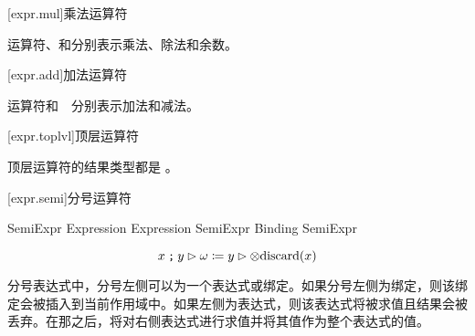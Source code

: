 [expr.mul]{乘法运算符}

\pnum
运算符\tcode{*}、\tcode{/}和\tcode{\%}分别表示乘法、除法和余数。

[expr.add]{加法运算符}

\pnum
运算符\tcode{+}和\ \tcode{-}\ 分别表示加法和减法。

[expr.toplvl]{顶层运算符}

\pnum
顶层运算符的结果类型都是 。

[expr.semi]{分号运算符}

\begin{bnf}{SemiExpr}
    Expression \br
    Expression \terminal{;} SemiExpr\br
    Binding \terminal{;} SemiExpr\br
\end{bnf}

$$ x \mathbin{\texttt{;}} y \rhd \omega \coloneqq y \rhd \otimes \mathrm{discard}(x)$$

\pnum
分号表达式中，分号左侧可以为一个表达式或绑定。如果分号左侧为绑定，则该绑定会被插入到当前作用域中。如果左侧为表达式，则该表达式将被求值且结果会被丢弃。在那之后，将对右侧表达式进行求值并将其值作为整个表达式的值。